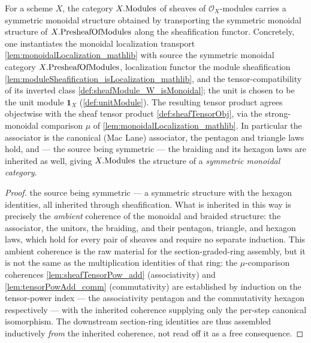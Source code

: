 \begin{definition}

  \label{def:sheafModule_monoidalStructure}
  For a scheme \(X\), the category \(X.\mathrm{Modules}\) of sheaves of
  \(\mathcal{O}_X\)-modules carries a symmetric monoidal structure obtained by
  transporting the symmetric monoidal structure of \(X.\mathrm{PresheafOfModules}\) along the
  sheafification functor. Concretely, one instantiates the monoidal localization
  transport \cref{lem:monoidalLocalization_mathlib} with source the symmetric
  monoidal category \(X.\mathrm{PresheafOfModules}\), localization functor the module sheafification
  \cref{lem:moduleSheafification_isLocalization_mathlib}, and the
  tensor-compatibility of its inverted class \cref{def:sheafModule_W_isMonoidal};
  the unit is chosen to be the unit module \(\mathbf{1}_X\) (\cref{def:unitModule}).
  The resulting tensor product agrees objectwise with the sheaf tensor product
  \cref{def:sheafTensorObj}, via the strong-monoidal comparison
  \(\mu\) of \cref{lem:monoidalLocalization_mathlib}. In particular the associator
  is the canonical (Mac Lane) associator, the pentagon and triangle laws hold, and
  --- the source being symmetric --- the braiding and its hexagon laws are
  inherited as well, giving \(X.\mathrm{Modules}\) the structure of a
  \emph{symmetric monoidal category}.
\end{definition}

\begin{proof}
  \leanok
  the source being symmetric --- a symmetric structure with the hexagon
  identities, all inherited through sheafification. What is inherited in this way
  is precisely the \emph{ambient} coherence of the monoidal and braided structure:
  the associator, the unitors, the braiding, and their pentagon, triangle, and
  hexagon laws, which hold for every pair of sheaves and require no separate
  induction. This ambient coherence is the raw material for the section-graded-ring
  assembly, but it is not the same as the multiplication identities of that ring:
  the \(\mu\)-comparison coherences \cref{lem:sheafTensorPow_add} (associativity)
  and \cref{lem:tensorPowAdd_comm} (commutativity) are established by induction on
  the tensor-power index --- the associativity pentagon and the commutativity
  hexagon respectively --- with the inherited coherence supplying only the
  per-step canonical isomorphism. The downstream section-ring identities are thus
  assembled inductively \emph{from} the inherited coherence, not read off it as a
  free consequence.
\end{proof}


